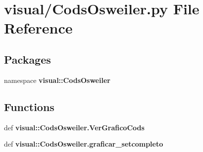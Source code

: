 \section{visual/\-Cods\-Osweiler.py \-File \-Reference}
\label{_cods_osweiler_8py}
\subsection*{\-Packages}
\begin{DoxyCompactItemize}
\item 
namespace {\bf visual\-::\-Cods\-Osweiler}
\end{DoxyCompactItemize}
\subsection*{\-Functions}
\begin{DoxyCompactItemize}
\item 
def {\bf visual\-::\-Cods\-Osweiler.\-Ver\-Grafico\-Cods}
\item 
def {\bf visual\-::\-Cods\-Osweiler.\-graficar\-\_\-setcompleto}
\end{DoxyCompactItemize}
